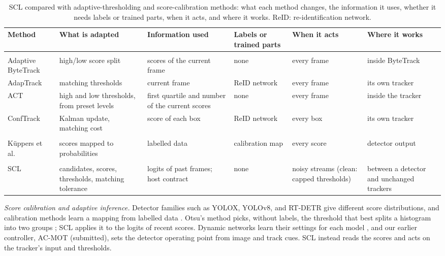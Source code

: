 \documentclass[pdflatex,sn-mathphys-num,iicol]{sn-jnl}
\newcommand{\scl}{SCL}
\newcommand{\priorctl}{our earlier controller, AC-MOT (submitted),}
\begin{document}
\begin{table}[!tp]
\caption{\scl{} compared with adaptive-thresholding and score-calibration methods: what each method
changes, the information it uses, whether it needs labels or trained parts, when it acts, and where
it works. ReID: re-identification network.}
\label{tab:compare}
\centering\footnotesize
\setlength{\tabcolsep}{2.5pt}
\begin{tabular}{@{}>{\raggedright\arraybackslash}p{26mm}>{\raggedright\arraybackslash}p{33mm}>{\raggedright\arraybackslash}p{32mm}>{\raggedright\arraybackslash}p{17mm}>{\raggedright\arraybackslash}p{19mm}>{\raggedright\arraybackslash}p{24mm}@{}}
\toprule
Method & What is adapted & Information used & Labels or trained parts & When it acts & Where it works\\
\midrule
\multicolumn{6}{@{}l}{\textit{Adaptive thresholding}}\\
Adaptive ByteTrack \cite{ma2023adaptivebytetrack} & high/low score split & scores of the current frame & none & every frame & inside ByteTrack\\
AdapTrack \cite{shim2024adaptrack} & matching thresholds & current frame & ReID network & every frame & its own tracker\\
ACT \cite{act2026adaptive} & high and low thresholds, from preset levels & first quartile and number of the current scores & none & every frame & inside the tracker\\
ConfTrack \cite{jung2024conftrack} & Kalman update, matching cost & score of each box & ReID network & every box & its own tracker\\
\addlinespace[2pt]
\multicolumn{6}{@{}l}{\textit{Score calibration}}\\
K{\"u}ppers et al.\ \cite{kuppers2020detcalib} & scores mapped to probabilities & labelled data & calibration map & every score & detector output\\
\addlinespace[2pt]
\multicolumn{6}{@{}l}{\textit{This paper}}\\
\scl{} & candidates, scores, thresholds, matching tolerance & logits of past frames; host contract & none & noisy streams (clean: capped thresholds) & between a detector and unchanged trackers\\
\bottomrule
\end{tabular}
\end{table}


\emph{Score calibration and adaptive inference.} Detector families such as YOLOX, YOLOv8, and
RT-DETR give different score distributions, and calibration methods learn a mapping from labelled
data \cite{kuppers2020detcalib}. Otsu's method picks, without labels, the threshold that best splits a
histogram into two groups \cite{goh2018otsu}; \scl{} applies it to the logits of recent scores. Dynamic
networks learn their settings for each model \cite{han2022dynamic}, and \priorctl{}
sets the detector operating point from image and track cues. \scl{} instead
reads the scores and acts on the tracker's input and thresholds.
\end{document}
